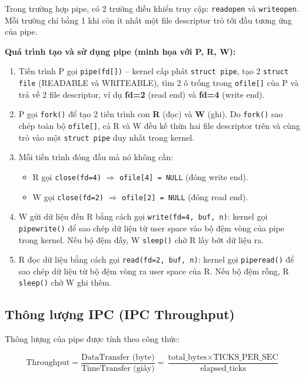 \documentclass[12pt,a4paper]{article}
\newcommand{\code}[1]{\texttt{#1}}
\newcommand{\tightlist}{\setlength{\itemsep}{2pt}\setlength{\parskip}{0pt}}
\begin{document}
Trong trường hợp pipe, có 2 trường điều khiển truy cập: \code{readopen} và
\code{writeopen}. Mỗi trường chỉ bằng 1 khi còn ít nhất một file descriptor trỏ tới đầu
tương ứng của pipe.

\textbf{Quá trình tạo và sử dụng pipe (minh họa với P, R, W):}
\begin{enumerate}\tightlist
    \item Tiến trình P gọi \code{pipe(fd[])} -- kernel cấp phát \code{struct pipe},
    tạo 2 \code{struct file} (READABLE và WRITEABLE), tìm 2 ô trống trong
    \code{ofile[]} của P và trả về 2 file descriptor, ví dụ \textbf{fd=2} (read end)
    và \textbf{fd=4} (write end).

    \item P gọi \code{fork()} để tạo 2 tiến trình con \textbf{R} (đọc) và \textbf{W}
    (ghi). Do \code{fork()} sao chép toàn bộ \code{ofile[]}, cả R và W đều kế thừa
    hai file descriptor trên và cùng trỏ vào một \code{struct pipe} duy nhất trong
    kernel.

    \item Mỗi tiến trình đóng đầu mà nó không cần:
    \begin{itemize}\tightlist
        \item R gọi \code{close(fd=4)} $\Rightarrow$ \code{ofile[4] = NULL} (đóng write end).
        \item W gọi \code{close(fd=2)} $\Rightarrow$ \code{ofile[2] = NULL} (đóng read end).
    \end{itemize}

    \item W gửi dữ liệu đến R bằng cách gọi \code{write(fd=4, buf, n)}: kernel gọi
    \code{pipewrite()} để sao chép dữ liệu từ user space vào bộ đệm vòng của pipe
    trong kernel. Nếu bộ đệm đầy, W \code{sleep()} chờ R lấy bớt dữ liệu ra.

    \item R đọc dữ liệu bằng cách gọi \code{read(fd=2, buf, n)}: kernel gọi
    \code{piperead()} để sao chép dữ liệu từ bộ đệm vòng ra user space của R. Nếu
    bộ đệm rỗng, R \code{sleep()} chờ W ghi thêm.
\end{enumerate}

\subsection{Thông lượng IPC (IPC Throughput)}

Thông lượng của pipe được tính theo công thức:

\begin{equation}
\text{Throughput} = \frac{\text{DataTransfer (byte)}}{\text{TimeTransfer (giây)}}
= \frac{\text{total\_bytes} \times \text{TICKS\_PER\_SEC}}{\text{elapsed\_ticks}}
\end{equation}
\end{document}
